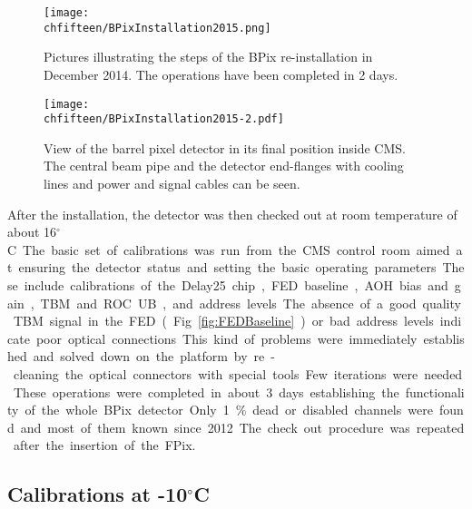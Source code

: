 \begin{figure}[!htb]
 \begin{center}
 \texttt{[image: \\chfifteen/BPixInstallation2015.png]}
 \end{center}
 \caption{Pictures illustrating the steps of the BPix re-installation in December 2014. The operations have been completed in 2 days.}
 \label{fig:BPixInst2}
\end{figure}

\begin{figure}[!htb]
 \begin{center}
 \texttt{[image: \\chfifteen/BPixInstallation2015-2.pdf]}
 \end{center}
 \caption{View of the barrel pixel detector in its final position inside CMS. The central beam pipe and the detector end-flanges with cooling lines and power and signal cables can be seen.}
 \label{fig:BPixInst3}
\end{figure}

After the installation, the detector was then checked out at room temperature of about 16\unit{$^\circ$C}.
The basic set of calibrations was run from the CMS control room aimed at ensuring the detector status and setting the basic operating parameters.
These include calibrations of the Delay25 chip, FED baseline, AOH bias and gain, TBM and ROC UB, and address levels.
The absence of a good quality TBM signal in the FED (Fig.~\ref{fig:FEDBaseline}) or bad address levels indicate poor optical connections.
This kind of problems were immediately established and solved down on the platform by re-cleaning the optical connectors with special tools.
Few iterations were needed.
These operations were completed in about 3 days establishing the functionality of the whole BPix detector.
Only 1\% dead or disabled channels were found and most of them known since 2012.
The check out procedure was repeated after the insertion of the FPix.

\subsection{Calibrations at -10\unit{$^\circ$C}}\label{sec:FinalBPixCalib}

